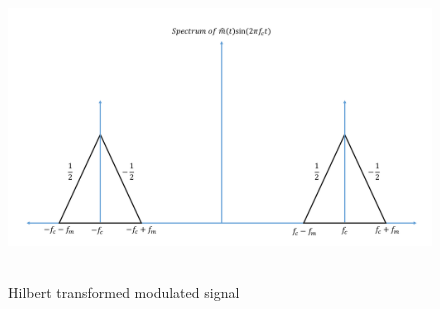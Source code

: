 \begin{figure}[h]
	\centering
	\includegraphics[width=1.0\textwidth, height=8cm]{./sdf/simplified_coherent_receiver/figures/SSB5.pdf}
	\caption{Hilbert transformed modulated signal}\label{Hilbert_Final}
\end{figure}

